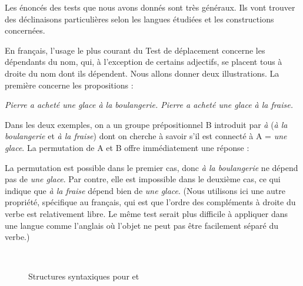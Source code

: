 Les énoncés des tests que nous avons donnés sont très généraux. Ils vont trouver des déclinaisons particulières selon les langues étudiées et les constructions concernées.\largerpage[-1]

En français, l’usage le plus courant du Test de déplacement concerne les dépendants du nom, qui, à l’exception de certains adjectifs, se placent tous à droite du nom dont ils dépendent. Nous allons donner deux illustrations. La première concerne les propositions :

\ea
  \ea \itshape Pierre a acheté une glace à la boulangerie.
  \ex \itshape Pierre a acheté une glace à la fraise.
  \z
\z

Dans les deux exemples, on a un groupe prépositionnel B introduit par \textit{à} (\textit{à la boulangerie} et \textit{à la fraise}) dont on cherche à savoir s’il est connecté à A = \textit{une glace}. La permutation de A et B offre immédiatement une réponse :

\ea
    \label{ex:boulangerie}
    \label{ex:fraise}
    \z
\z

La permutation est possible dans le premier cas, donc \textit{à la boulangerie} ne dépend pas de \textit{une glace}. Par contre, elle est impossible dans le deuxième cas, ce qui indique que \textit{à la fraise} dépend bien de \textit{une glace}. (Nous utilisons ici une autre propriété, spécifique au français, qui est que l’ordre des compléments à droite du verbe est relativement libre. Le même test serait plus difficile à appliquer dans une langue comme l’anglais où l’objet ne peut pas être facilement séparé du verbe.)\largerpage

\begin{figure}
\medskip\\
\caption{Structures syntaxiques pour  et }
\end{figure}

